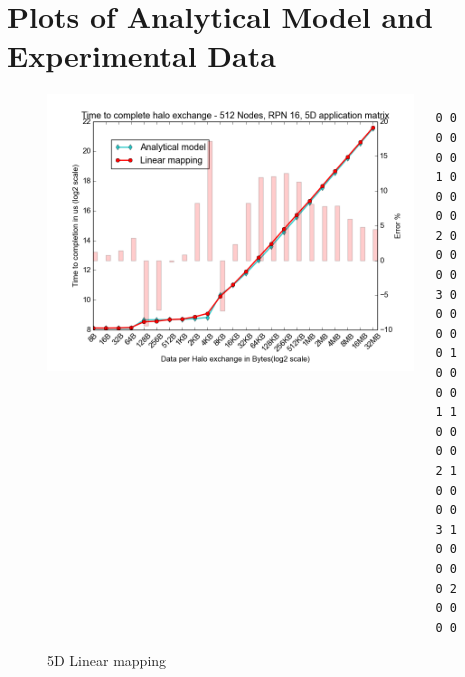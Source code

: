 \documentclass{beamer}
\begin{document}
\section{Plots of Analytical Model and Experimental Data}

\begin{frame}[fragile]
\begin{figure}
\caption{5D Linear mapping}
\begin{columns}
  \begin{column}{0.6\textwidth}
    \includegraphics[width=1\textwidth]{../mappings/5d_linear_model.png}
  \end{column}
  \begin{column}{0.3\textwidth}
\lstset{title=Mapping sample}
\begin{lstlisting}[basicstyle=\footnotesize\ttfamily, frame=lines,columns=fixed]
0 0 0 0 0 0
1 0 0 0 0 0
2 0 0 0 0 0
3 0 0 0 0 0
0 1 0 0 0 0
1 1 0 0 0 0
2 1 0 0 0 0
3 1 0 0 0 0
0 2 0 0 0 0
\end{lstlisting}
  \end{column}

\end{columns}
\end{figure}
\end{frame}
\end{document}
